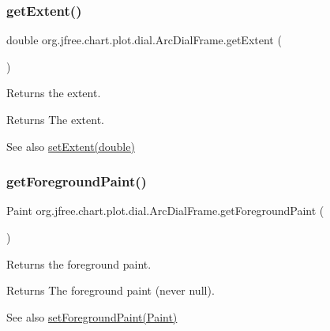\subsubsection{\texorpdfstring{get\+Extent()}{getExtent()}}
{\footnotesize\ttfamily double org.\+jfree.\+chart.\+plot.\+dial.\+Arc\+Dial\+Frame.\+get\+Extent (\begin{DoxyParamCaption}{ }\end{DoxyParamCaption})}

Returns the extent.

\begin{DoxyReturn}{Returns}
The extent.
\end{DoxyReturn}
\begin{DoxySeeAlso}{See also}
\mbox{\hyperlink{classorg_1_1jfree_1_1chart_1_1plot_1_1dial_1_1_arc_dial_frame_a4b7b0351cdc0a449229ba4201f11e0c5}{set\+Extent(double)}} 
\end{DoxySeeAlso}
\mbox{\label{classorg_1_1jfree_1_1chart_1_1plot_1_1dial_1_1_arc_dial_frame_a918c4dd5e80bc020ee7491ade8bf874a}} 
\subsubsection{\texorpdfstring{get\+Foreground\+Paint()}{getForegroundPaint()}}
{\footnotesize\ttfamily Paint org.\+jfree.\+chart.\+plot.\+dial.\+Arc\+Dial\+Frame.\+get\+Foreground\+Paint (\begin{DoxyParamCaption}{ }\end{DoxyParamCaption})}

Returns the foreground paint.

\begin{DoxyReturn}{Returns}
The foreground paint (never {\ttfamily null}).
\end{DoxyReturn}
\begin{DoxySeeAlso}{See also}
\mbox{\hyperlink{classorg_1_1jfree_1_1chart_1_1plot_1_1dial_1_1_arc_dial_frame_a5f5ee601d06bf9d0c0e447b8ec3ec969}{set\+Foreground\+Paint(\+Paint)}} 
\end{DoxySeeAlso}
\mbox{\label{classorg_1_1jfree_1_1chart_1_1plot_1_1dial_1_1_arc_dial_frame_abb7997fb0e86fb41d6e760b230b71a24}} 
